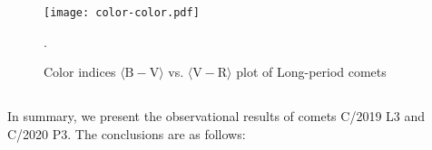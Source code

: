 
\begin{figure}
    \centering
    \texttt{[image: color-color.pdf]}
    \caption{Color indices $\langle \mathrm{B-V} \rangle$ vs. $\langle \mathrm{V-R} \rangle$ plot of Long-period comets}.\label{fig:color-color}
\end{figure}

\subsection{}

\cite{jewittCOLORSYSTEMATICSCOMETS2015}

\subsection{}
In summary, we present the observational results of comets C/2019 L3 and C/2020 P3. The conclusions are as follows: 
